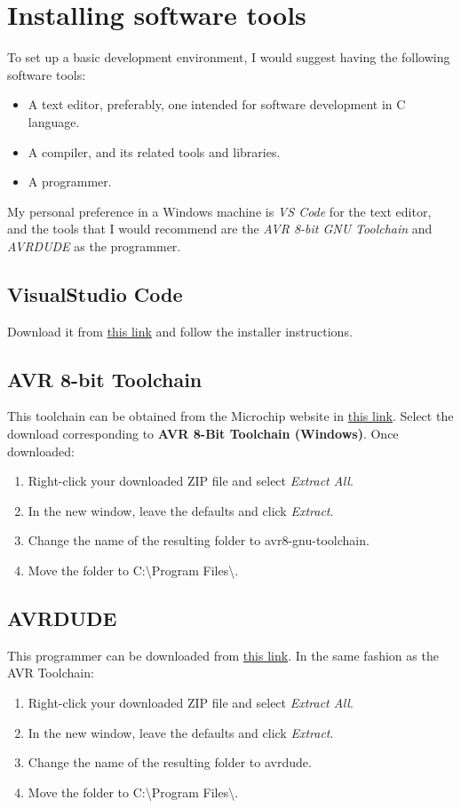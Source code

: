\documentclass[10pt,letterpaper]{article}
\begin{document}
\section{Installing software tools}
To set up a basic development environment, I would suggest having the following software tools:
\begin{itemize}
    \item A text editor, preferably, one intended for software development in C language.
    \item A compiler, and its related tools and libraries.
    \item A programmer.
\end{itemize}
My personal preference in a Windows machine is \textit{VS Code} for the text editor, and the tools that I would recommend are the \textit{AVR 8-bit GNU Toolchain} and \textit{AVRDUDE} as the programmer.

\subsection{VisualStudio Code}
Download it from \href{https://code.visualstudio.com/Download}{this link} and follow the installer instructions.

\subsection{AVR 8-bit Toolchain}
This toolchain can be obtained from the Microchip website in \href{https://www.microchip.com/en-us/tools-resources/develop/microchip-studio/gcc-compilers}{this link}. Select the download corresponding to \textbf{AVR 8-Bit Toolchain (Windows)}. Once downloaded:
\begin{enumerate}
    \item Right-click your downloaded ZIP file and select \textit{Extract All}.
    \item In the new window, leave the defaults and click \textit{Extract}.
    \item Change the name of the resulting folder to {\color{ForestGreen}avr8-gnu-toolchain}. 
    \item Move the folder to {\color{ForestGreen}C:\textbackslash Program Files\textbackslash}.
\end{enumerate}

\subsection{AVRDUDE}
This programmer can be downloaded from \href{https://github.com/avrdudes/avrdude/releases}{this link}. In the same fashion as the AVR Toolchain:
\begin{enumerate}
    \item Right-click your downloaded ZIP file and select \textit{Extract All}.
    \item In the new window, leave the defaults and click \textit{Extract}.
    \item Change the name of the resulting folder to {\color{ForestGreen}avrdude}. 
    \item Move the folder to {\color{ForestGreen}C:\textbackslash Program Files\textbackslash}.
\end{enumerate}
\end{document}

